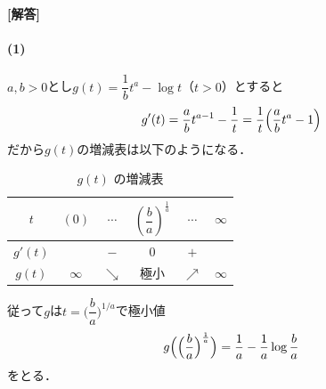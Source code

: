 \documentclass[../../main.tex]{subfiles}
\begin{document}
\begin{oframed}
  
\end{oframed}

{\bf [解答]}
\paragraph{(1)}

$a,b>0$とし$g(t)=\dfrac{1}{b}t^a-\log t$（$t>0$）とすると
\begin{align}
  g'(t)=\dfrac{a}{b}t^{a-1}-\dfrac{1}{t}=\dfrac{1}{t}\Bigl(\dfrac{a}{b}t^a-1\Bigr)
\end{align}
だから$g(t)$の増減表は以下のようになる．

\begin{table}[htb]
  \centering
  \caption{$g(t)$ の増減表}
  \label{tab:g_t}
  \begin{tabular}{c|ccccc}
    $t$     & $(0)$ & $\cdots$ & $\left(\dfrac{b}{a}\right)^{\frac{1}{a}}$ & $\cdots$ & $\infty$\\ \hline
    $g'(t)$ & & $-$ & $0$ & $+$ & \\ \hline
    $g(t)$  & $\infty$& $\searrow$ & 極小 & $\nearrow$ & $\infty$
  \end{tabular}
\end{table}

従って$g$は$t=\bigl(\dfrac{b}{a}\bigr)^{1/a}$で極小値
\begin{align}
  g\Bigl(\Bigl(\dfrac{b}{a}\Bigr)^{\frac{1}{a}}\Bigr)=\dfrac{1}{a}-\dfrac{1}{a}\log\dfrac{b}{a}
\end{align}
をとる．
\end{document}

